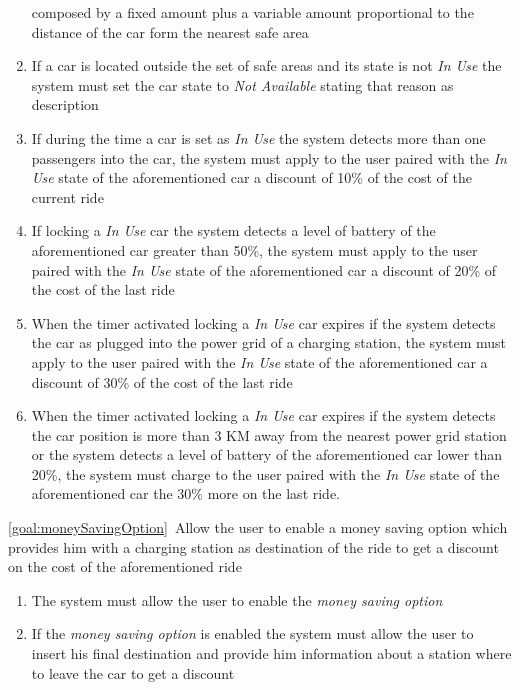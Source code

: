 \begin{description}
\begin{enumerate}[resume*]
  				composed by a fixed amount plus a variable amount proportional to the distance of the
  				car form the nearest safe area
  				\item If a car is located outside the set of safe areas and its state is not \emph{In
  				Use} the system must set the car state to \emph{Not Available}  stating that reason as
  				description
  				\item If during the time a car is set as \emph{In Use} the system detects more than
  				one passengers into the car, the system must apply to the user paired with the
  				\emph{In Use} state of the aforementioned car a discount of 10\% of the cost of
  				the current ride
  				\item If locking  a \emph{In Use} car the system detects a level of battery of the
  				aforementioned car greater than 50\%, the system must apply to the user paired with
  				the \emph{In Use} state of the aforementioned car a discount of 20\% of the cost
  				of the last ride
  				\item When the timer activated locking a \emph{In Use} car expires if the system
  				detects the car as plugged into the power grid of a charging station, the system must
  				apply to the user paired with the \emph{In Use} state of the aforementioned car a
  				discount of 30\% of the cost of the last ride
  				\item When the timer activated locking a \emph{In Use} car expires if the system
  				detects the car position is more than 3 KM away from the nearest power grid station
  				or the system detects a level of battery of the aforementioned car lower than 20\%, 
  				the system must charge to the user paired with the \emph{In Use} state of the 
  				aforementioned car the 30\% more on the last ride. 
   			\end{enumerate}
  		\item \ref{goal:moneySavingOption}\ Allow the user to enable a money saving option which provides him with a charging station as destination of the ride to get a discount on the cost of the aforementioned ride
  			\begin{enumerate}[resume*]
  				\item The system must allow the user to enable the \emph{money saving option}
  				\item If the  \emph{money saving option} is enabled the system must allow the user
  				to insert his final destination and provide him information about a station where to
  				leave the car to get a discount

\end{enumerate}
\end{description}
